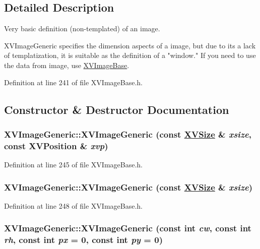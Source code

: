 \subsection{Detailed Description}
Very basic definition (non-templated) of an image.

XVImage\-Generic specifies the dimension aspects of a image, but due to its a lack of templatization, it is suitable as  the definition of a "window." If you need to use the data from image, use \hyperlink{class_XVImageBase}{XVImage\-Base}. 



Definition at line 241 of file XVImage\-Base.h.

\subsection{Constructor \& Destructor Documentation}
\label{XVImageGeneric_a0}
\hypertarget{class_XVImageGeneric_a0}{
\subsubsection[XVImageGeneric]{\setlength{\rightskip}{0pt plus 5cm}XVImage\-Generic::XVImage\-Generic (const \hyperlink{class_XVSize}{XVSize} \& {\em xsize}, const XVPosition \& {\em xvp})}}




Definition at line 245 of file XVImage\-Base.h.\label{XVImageGeneric_a1}
\hypertarget{class_XVImageGeneric_a1}{
\subsubsection[XVImageGeneric]{\setlength{\rightskip}{0pt plus 5cm}XVImage\-Generic::XVImage\-Generic (const \hyperlink{class_XVSize}{XVSize} \& {\em xsize})}}




Definition at line 248 of file XVImage\-Base.h.\label{XVImageGeneric_a2}
\hypertarget{class_XVImageGeneric_a2}{
\subsubsection[XVImageGeneric]{\setlength{\rightskip}{0pt plus 5cm}XVImage\-Generic::XVImage\-Generic (const int {\em cw}, const int {\em rh}, const int {\em px} = 0, const int {\em py} = 0)}}





